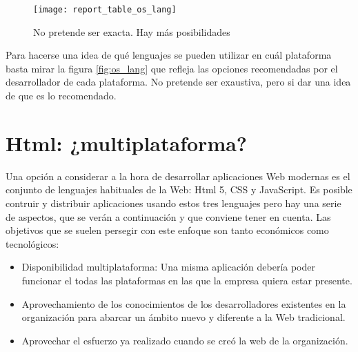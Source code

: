 \documentclass[
10pt, %
a4paper, %
oneside, %
headinclude,footinclude, %
BCOR5mm, %
]{scrartcl}
\begin{document}
\begin{figure}[h]
\centering 
\texttt{[image: report\_table\_os\_lang]} 
\caption[Sistemas Operativos y Lenguajes]{No pretende ser exacta. Hay más posibilidades} 
\label{fig:os_lang} 
\end{figure}

Para hacerse una idea de qué lenguajes se pueden utilizar en cuál plataforma basta mirar la figura \vref{fig:os_lang} que refleja las opciones recomendadas por el desarrollador de cada plataforma. No pretende ser exaustiva, pero si dar una idea de que es lo recomendado.

\section{Html: ¿multiplataforma?}
Una opción a considerar a la hora de desarrollar aplicaciones Web modernas es el conjunto de lenguajes habituales de la Web: Html 5, CSS y JavaScript. Es posible contruir y distribuir aplicaciones usando estos tres lenguajes pero hay una serie de aspectos, que se verán a continuación y que conviene tener en cuenta. Las objetivos que se suelen persegir con este enfoque son tanto económicos como tecnológicos: 

\begin{itemize}
\item Disponibilidad multiplataforma: Una misma aplicación debería poder funcionar el todas las plataformas en las que la empresa quiera estar presente.
\item Aprovechamiento de los conocimientos de los desarrolladores existentes en la organización para abarcar un ámbito nuevo y diferente a la Web tradicional.
\item Aprovechar el esfuerzo ya realizado cuando se creó la web de la organización.
\end{itemize}
\end{document}
